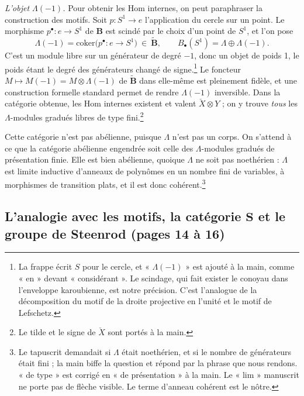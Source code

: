 \documentclass[11pt,a4paper]{article}
\begin{document}
\emph{L'objet $\Lambda(-1)$.} Pour obtenir les $\mathrm{Hom}$ internes, on peut
paraphraser la construction des motifs. Soit $p : S^{1} \to e$ l'application
du cercle sur un point. Le morphisme $p^{\bullet} : e \to S^{1}$ de
$\mathbf{B}$ est scindé par le choix d'un point de $S^{1}$, et l'on pose
\[
\Lambda(-1) = \mathrm{coker}\big(p^{\bullet} : e \to S^{1}\big)
\ \in\ \widetilde{\mathbf{B}},
\qquad
B_\bullet(S^{1}) = \Lambda \oplus \Lambda(-1).
\]
C'est un module libre sur un générateur de degré $-1$, donc un objet de poids
1, le poids étant le degré des générateurs changé de signe.\footnote{La frappe
écrit $S$ pour le cercle, et « $\Lambda(-1)$ » est ajouté à la main, comme
« en » devant « considérant ». Le scindage, qui fait exister le conoyau dans
l'enveloppe karoubienne, est notre précision. C'est l'analogue de la
décomposition du motif de la droite projective en l'unité et le motif de
Lefschetz.} Le foncteur $M \mapsto M(-1) = M \otimes \Lambda(-1)$ de
$\widetilde{\mathbf{B}}$ dans elle-même est pleinement fidèle, et une
construction formelle standard permet de rendre $\Lambda(-1)$ inversible. Dans
la catégorie obtenue, les $\mathrm{Hom}$ internes existent et valent $\check{X}
\otimes Y$ ; on y trouve \emph{tous} les $\Lambda$-modules gradués libres de
type fini.\footnote{Le tilde et le signe de $\check{X}$ sont portés à la
main.}

Cette catégorie n'est pas abélienne, puisque $\Lambda$ n'est pas un corps. On
s'attend à ce que la catégorie abélienne engendrée soit celle des
$\Lambda$-modules gradués de présentation finie. Elle est bien abélienne,
quoique $\Lambda$ ne soit pas noethérien : $\Lambda$ est limite inductive
d'anneaux de polynômes en un nombre fini de variables, à morphismes de
transition plats, et il est donc cohérent.\footnote{Le tapuscrit demandait si
$\Lambda$ était noethérien, et si le nombre de générateurs était fini ; la
main biffe la question et répond par la phrase que nous rendons. « de type »
est corrigé en « de présentation » à la main. Le « lim » manuscrit ne porte pas
de flèche visible. Le terme d'anneau cohérent est le nôtre.}

\subsection*{L'analogie avec les motifs, la catégorie $\mathbf{S}$ et le groupe de Steenrod (pages 14 à 16)}
\end{document}

